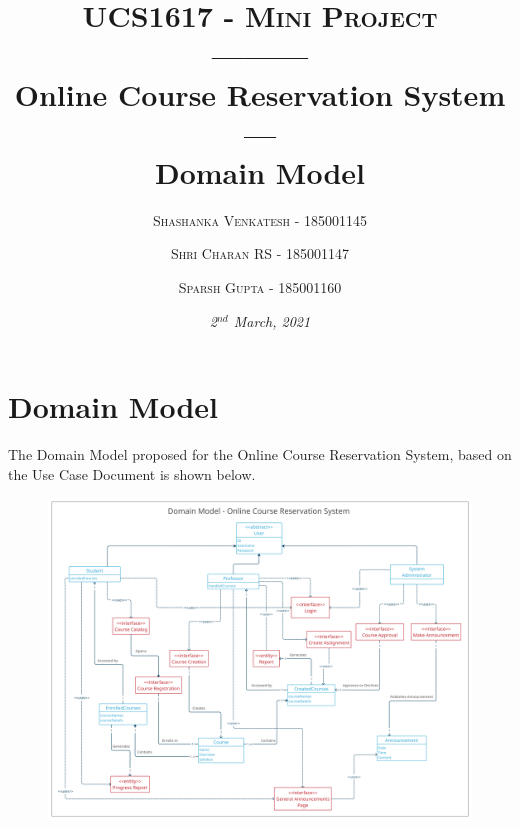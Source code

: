 \documentclass[12pt, a4]{article}
\title{{\large \textsc{UCS1617 - Mini Project}}\\---------\\\textbf{\huge{Online Course Reservation System}}\\---\\\textbf{Domain Model}}
\author {
  \textsc{Shashanka Venkatesh - 185001145}
  \and
  \textsc{Shri Charan RS - 185001147}
  \and
  \textsc{Sparsh Gupta - 185001160}
}
\date{\normalsize{\textsl{2$^{nd}$ March, 2021}}}
\begin{document}
\maketitle

\newpage
\section{Domain Model}
The Domain Model proposed for the Online Course Reservation System, based on the Use Case Document is shown below.
\begin{figure}[h]
    \centering
    \includegraphics[width=\textwidth]{Domain Model.png}
\end{figure}
\end{document}
